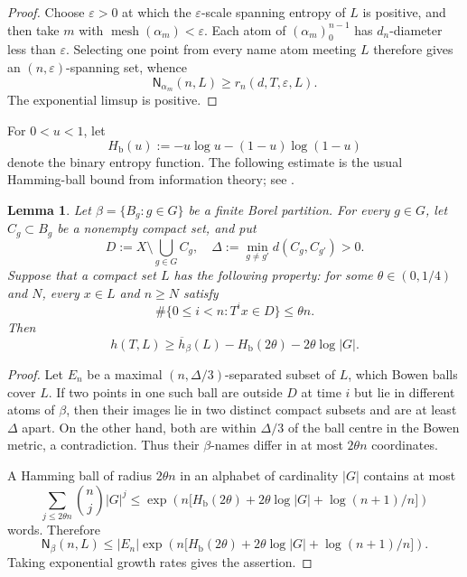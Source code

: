\documentclass[10pt,a4paper]{amsart}
\newcommand{\mesh}{\operatorname{mesh}}
\newcommand{\Nname}{\mathsf N}
\newcommand{\Hb}{H_{\mathrm b}}
\newtheorem{lemma}[theorem]{Lemma}
\numberwithin{equation}{section}
\begin{document}
	\begin{proof}
		Choose $\varepsilon>0$ at which the $\varepsilon$-scale spanning entropy of
		$L$ is positive, and then take $m$ with
		$\mesh(\alpha_m)<\varepsilon$. Each atom of
		$(\alpha_m)_0^{n-1}$ has $d_n$-diameter less than $\varepsilon$. Selecting
		one point from every name atom meeting $L$ therefore gives an
		$(n,\varepsilon)$-spanning set, whence
		\[
		\Nname_{\alpha_m}(n,L)\geq r_n(d,T,\varepsilon,L).
		\]
		The exponential limsup is positive.
	\end{proof}
	
	For $0<u<1$, let
	\[
	\Hb(u):=-u\log u-(1-u)\log(1-u)
	\]
	denote the binary entropy function. The following estimate is the usual
	Hamming-ball bound from information theory; see
	\cite{CoverThomas2006,Shannon1949}.
	
	\begin{lemma}
		\label{lem:hamming-bowen}
		Let $\beta=\{B_g:g\in G\}$ be a finite Borel partition. For every $g\in G$,
		let $C_g\subset B_g$ be a nonempty compact set, and put
		\[
		D:=X\setminus\bigcup_{g\in G}C_g,
		\quad
		\Delta:=\min_{g\neq g'}d(C_g,C_{g'})>0.
		\]
		Suppose that a compact set $L$ has the following property: for some
		$\theta\in(0,1/4)$ and $N$, every $x\in L$ and $n\geq N$ satisfy
		\[
		\#\{0\leq i<n:T^ix\in D\}\leq\theta n.
		\]
		Then
		\[
		h(T,L)
		\geq
		\overline h_\beta(L)-\Hb(2\theta)-2\theta\log|G|.
		\]
	\end{lemma}
	
	\begin{proof}
		Let $E_n$ be a maximal $(n,\Delta/3)$-separated subset of $L$, which Bowen balls cover $L$. If two points in one such ball are outside $D$ at time $i$
		but lie in different atoms of $\beta$, then their images lie in two distinct
		compact subsets and are at least $\Delta$ apart. On the other hand, both are
		within $\Delta/3$ of the ball centre in the Bowen metric, a contradiction.
		Thus their $\beta$-names differ in at most $2\theta n$ coordinates.
		
		A Hamming ball of radius $2\theta n$ in an alphabet of cardinality $|G|$
		contains at most
		\[
		\sum_{j\leq2\theta n}\binom nj|G|^j
		\leq
		\exp\left(
		n\bigl[\Hb(2\theta)+2\theta\log|G|+\log(n+1)/n\bigr]
		\right)
		\]
		words. Therefore
		\[
		\Nname_\beta(n,L)
		\leq
		|E_n|
		\exp\left(
		n\bigl[\Hb(2\theta)+2\theta\log|G|+\log(n+1)/n\bigr]
		\right).
		\]
		Taking exponential growth rates gives the assertion.
	\end{proof}
	
\end{document}
